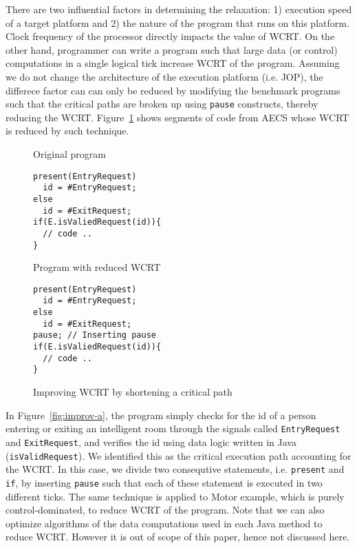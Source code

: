 There are two influential factors in determining the relaxation: 1)
execution speed of a target platform and 2) the nature of the program
that runs on this platform. Clock frequency of the processor directly
impacts the value of WCRT. On the other hand, programmer can write a
program such that large data (or control) computations in a single
logical tick increase WCRT of the program.  Assuming we do not change
the architecture of the execution platform (i.e. JOP), the differece
factor can can only be reduced by modifying the benchmark programs such
that the critical paths are broken up using \texttt{pause} constructs,
thereby reducing the WCRT.  Figure~\ref{fig:improv} shows segments of
code from AECS whose WCRT is reduced by such technique.

\begin{figure}[h!]
	\centering
	\begin{SubFloat}{\label{fig:improv-a}Original program}
    \begin{minipage}[b]{0.3\linewidth}
			\scriptsize
\begin{verbatim}
present(EntryRequest)
  id = #EntryRequest;
else
  id = #ExitRequest;
if(E.isValiedRequest(id)){
  // code ..
}
\end{verbatim}
\end{minipage}
\end{SubFloat}
  \hspace{1cm}%
  \begin{SubFloat}{\label{fig:improv-b}Program with reduced WCRT}
    \centering
    \begin{minipage}[b]{0.35\linewidth}
      \scriptsize
\begin{verbatim}
present(EntryRequest)
  id = #EntryRequest;
else
  id = #ExitRequest;
pause; // Inserting pause
if(E.isValiedRequest(id)){
  // code ..
}
\end{verbatim}
		\end{minipage}
	\end{SubFloat}
	\caption{Improving WCRT by shortening a critical path}
	\label{fig:improv}
\end{figure}

In Figure~\ref{fig:improv-a}, the program simply checks for the id of a
person entering or exiting an intelligent room through the signals
called \texttt{EntryRequest} and \texttt{ExitRequest}, and verifies the
id using data logic written in Java (\texttt{isValidRequest}). We
identified this as the critical execution path accounting for the WCRT.
In this case, we divide two consequtive statements, i.e.
\texttt{present} and \texttt{if}, by inserting \texttt{pause} such that
each of these statement is executed in two different ticks. The same
technique is applied to Motor example, which is purely
control-dominated, to reduce WCRT of the program. Note that we can also
optimize algorithms of the data computations used in each Java method to
reduce WCRT. However it is out of scope of this paper, hence not
discussed here.

